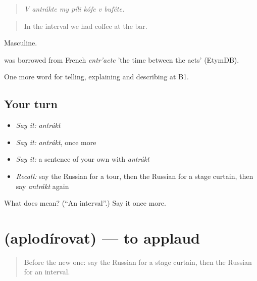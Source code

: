 \begin{quote}
\emph{V antrákte my píli kófe v buféte.}
\end{quote}

\begin{quote}
In the interval we had coffee at the bar.
\end{quote}

Masculine.

\begin{cousinweb}
\emph{} was borrowed from French \emph{entr'acte} 'the time between the acts' (EtymDB).
\end{cousinweb}

\begin{grammarlens}[title={What you've built}]
One more word for telling, explaining and describing at B1.
\end{grammarlens}

\subsection*{Your turn}
\begin{itemize}
\raggedright
  \item \emph{Say it:} \emph{antrákt}
  \item \emph{Say it:} \emph{antrákt}, once more
  \item \emph{Say it:} a sentence of your own with \emph{antrákt}
  \item \emph{Recall:} say the Russian for a tour, then the Russian for a stage curtain, then say \emph{antrákt} again
\end{itemize}

\begin{tcolorbox}[breakable,colback=teal!4,colframe=teal!35!black,title={Before you move on}]
What does  mean? (\textquotedblleft{}An interval\textquotedblright{}.) Say it once more.
\end{tcolorbox}
\section[\texorpdfstring{\ru{аплодировать} (aplodírovat)}{аплодировать (aplodírovat)}]{ (aplodírovat) — to applaud}

\label{lesson:RU-C519-aplodirovat}



\begin{quote}
Before the new one: say the Russian for a stage curtain, then the Russian for an interval.
\end{quote}

